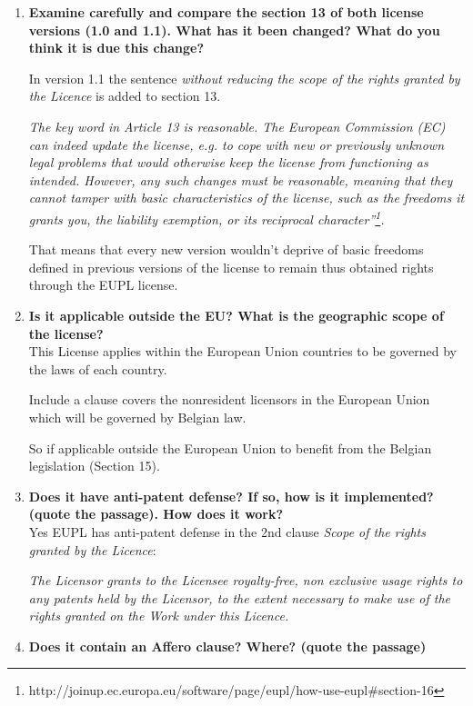 \documentclass[11pt]{scrartcl}
\begin{document}
\begin{enumerate}
	\item \textbf{Examine carefully and compare the section 13 of both license versions (1.0 and 1.1). What has it been changed? What do you think it is due this change?}
	
	In version 1.1 the sentence \emph{without reducing the scope of the rights granted by the Licence} is added to section 13.
	
	\emph{The key word in Article 13 is reasonable. The European Commission (EC) can indeed update the license, e.g. to cope with new or previously unknown legal problems that would otherwise keep the license from functioning as intended. However, any such changes must be reasonable, meaning that they cannot tamper with basic characteristics of the license, such as the freedoms it grants you, the liability exemption, or its reciprocal character”\footnote{http://joinup.ec.europa.eu/software/page/eupl/how-use-eupl\#section-16}.}
	
	That means that every new version wouldn't deprive of basic freedoms defined in previous versions of the license to remain thus obtained rights through the EUPL license.
	
	\item \textbf{Is it applicable outside the EU? What is the geographic scope of the license?}\\

	This License applies within the European Union countries to be governed by the laws of each country.

	Include a clause covers the nonresident licensors in the European Union which will be governed by Belgian law.

	So if applicable outside the European Union to benefit from the Belgian legislation (Section 15).
	
	\item \textbf{Does it have anti-patent defense? If so, how is it implemented? (quote the passage). How does it work?}\\

	Yes EUPL has anti-patent defense in the 2nd clause \emph{Scope of the rights granted by the Licence}:

		\emph{The Licensor grants to the Licensee royalty-free, non exclusive usage rights to any
patents held by the Licensor, to the extent necessary to make use of the rights granted
on the Work under this Licence.}

	\item \textbf{Does it contain an Affero clause? Where? (quote the passage)}


\end{enumerate}
\end{document}
